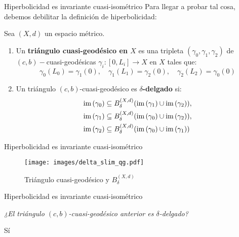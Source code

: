 \documentclass[xcolor=dvipsnames]{beamer}
\theoremstyle{largebreak}
\newcommand\cf[3]{\ensuremath{#1:#2\rightarrow#3}}
\newcommand{\im}[1]{\ensuremath{\textup{im}\left(#1\right)}}
\begin{document}
\begin{frame}{Hiperbolicidad es invariante cuasi-isométrico}
    Para llegar a probar tal cosa, debemos debilitar la definición de hiperbolicidad:
    
    \begin{mydef}
        Sea $(X,d)$ un espacio métrico.
        \begin{enumerate}[label = \textit{\arabic*}]
            \item Un \textbf{triángulo cuasi-geodésico en $X$} es una tripleta $(\gamma_0,\gamma_1,\gamma_2)$ de $(c,b)-$cuasi-geodésicas $\cf{\gamma_i}{[0,L_i]}{X}$ en $X$ tales que:
            \begin{equation*}
                \gamma_0(L_0)=\gamma_1(0),\quad \gamma_1(L_1)=\gamma_2(0),\quad \gamma_2(L_2)=\gamma_0(0)
            \end{equation*}
            \item Un triángulo $(c,b)$-cuasi-geodésico es \textbf{$\delta$-delgado} si:
            \begin{equation*}
                \begin{split}
                    \im{\gamma_0}&\subseteq B_{\delta}^{(X,d)}(\im{\gamma_1}\cup\im{\gamma_2}),\\
                    \im{\gamma_1}&\subseteq B_{\delta}^{(X,d)}(\im{\gamma_0}\cup\im{\gamma_2}),\\
                    \im{\gamma_2}&\subseteq B_{\delta}^{(X,d)}(\im{\gamma_0}\cup\im{\gamma_1})\\
                \end{split}
            \end{equation*}
        \end{enumerate}
    \end{mydef}
\end{frame}

\begin{frame}{Hiperbolicidad es invariante cuasi-isométrico}
    \begin{figure}
        \begin{center}
            \texttt{[image: images/delta\_slim\_qg.pdf]}
        \end{center}
        \caption{Triángulo cuasi-geodésico  y $B_\delta^{(X,d)}$}
    \end{figure}
\end{frame}

\begin{frame}{Hiperbolicidad es invariante cuasi-isométrico}
    \begin{center}
        \Large \textit{¿El triángulo $(c,b)$-cuasi-geodésico anterior es $\delta$-delgado?}
        \pause
        
        Sí
    \end{center}    
\end{frame}
\end{document}
